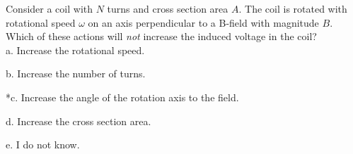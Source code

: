
Consider a coil with \(N\) turns and cross section area \(A\). The coil is
rotated with rotational speed \(\omega\) on an axis perpendicular to a B-field with magnitude
\(B\). Which of these actions will \emph{not} increase the induced voltage in the coil?\\

a. Increase the rotational speed.

b. Increase the number of turns.

*c. Increase the angle of the rotation axis to the field.

d. Increase the cross section area.

e. I do not know.\\
